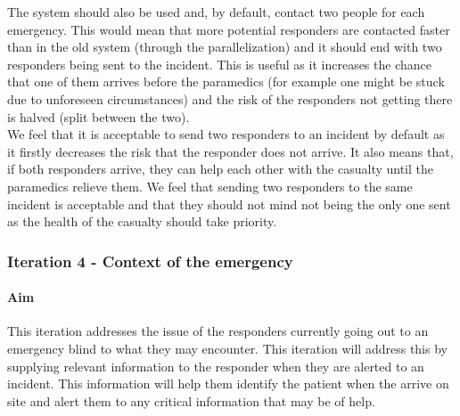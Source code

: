 \documentclass{article}
\begin{document}
The system should also be used and, by default, contact two people for each emergency. This would mean that more potential responders are contacted faster than in the old system (through the parallelization) and it should end with two responders being sent to the incident. This is useful as it increases the chance that one of them arrives before the paramedics (for example one might be stuck due to unforeseen circumstances) and the risk of the responders not getting there is halved (split between the two). \\

We feel that it is acceptable to send two responders to an incident by default as it firstly decreases the risk that the responder does not arrive. It also means that, if both responders arrive, they can help each other with the casualty until the paramedics relieve them. We feel that sending two responders to the same incident is acceptable and that they should not mind not being the only one sent as the health of the casualty should take priority.\\



\pagebreak
		\subsubsection{Iteration 4 - Context of the emergency}
		\paragraph{Aim}
This iteration addresses the issue of the responders currently going out to an emergency blind to what they may encounter. This iteration will address this by supplying relevant information to the responder when they are alerted to an incident. This information will help them identify the patient when the arrive on site and alert them to any critical information that may be of help.\\
\end{document}
